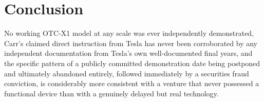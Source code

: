 \documentclass[11pt]{article}
\begin{document}
\section{Conclusion}

No working OTC-X1 model at any scale was ever independently demonstrated, Carr's claimed direct instruction from Tesla has never been corroborated by any independent documentation from Tesla's own well-documented final years, and the specific pattern of a publicly committed demonstration date being postponed and ultimately abandoned entirely, followed immediately by a securities fraud conviction, is considerably more consistent with a venture that never possessed a functional device than with a genuinely delayed but real technology.
\end{document}
